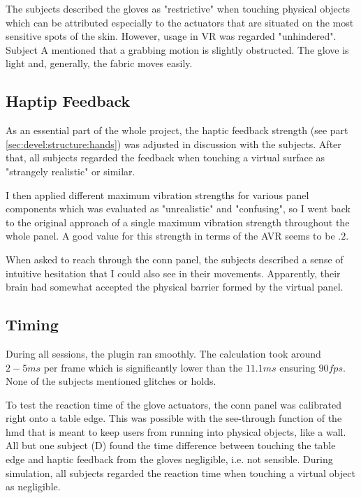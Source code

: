 \documentclass[hyperref, bachelorofscience]{cgvpub}
\begin{document}
The subjects described the gloves as "restrictive" when touching physical objects which can be attributed especially to the actuators that are situated on the most sensitive spots of the skin. However, usage in VR was regarded "unhindered". Subject A mentioned that a grabbing motion is slightly obstructed. The glove is light and, generally, the fabric moves easily. 

\subsection{Haptip Feedback}
As an essential part of the whole project, the haptic feedback strength (see part \ref{sec:devel:structure:hands}) was adjusted in discussion with the subjects. After that, all subjects regarded the feedback when touching a virtual surface as "strangely realistic" or similar. 

I then applied different maximum vibration strengths for various panel components which was evaluated as "unrealistic" and "confusing", so I went back to the original approach of a single maximum vibration strength throughout the whole panel. A good value for this strength in terms of the \Gls{AVR} seems to be $ .2 $.

When asked to reach through the conn panel, the subjects described a sense of intuitive hesitation that I could also see in their movements. Apparently, their brain had somewhat accepted the physical barrier formed by the virtual panel. 

\subsection{Timing}
During all sessions, the plugin ran smoothly. The calculation took around $ 2-5ms $ per frame which is significantly lower than the $ 11.1ms $ ensuring $ 90fps $. None of the subjects mentioned glitches or holds. 

To test the reaction time of the glove actuators, the conn panel was calibrated right onto a table edge. This was possible with the see-through function of the \acrshort{hmd} that is meant to keep users from running into physical objects, like a wall. All but one subject (D) found the time difference between touching the table edge and haptic feedback from the gloves negligible, i.e. not sensible. During simulation, all subjects regarded the reaction time when touching a virtual object as negligible.
\end{document}
